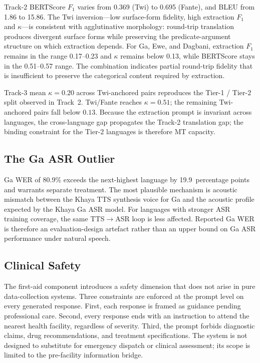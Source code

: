 \documentclass[conference]{IEEEtran}
\begin{document}
Track-2 BERTScore $F_{1}$ varies from 0.369 (Twi) to 0.695 (Fante),
and BLEU from 1.86 to 15.86. The Twi inversion---low surface-form
fidelity, high extraction $F_{1}$ and $\kappa$---is consistent with
agglutinative morphology: round-trip translation produces divergent
surface forms while preserving the predicate-argument structure on
which extraction depends. For Ga, Ewe, and Dagbani, extraction
$F_{1}$ remains in the range 0.17--0.23 and $\kappa$ remains below
0.13, while BERTScore stays in the 0.51--0.57 range. The combination
indicates partial round-trip fidelity that is insufficient to
preserve the categorical content required by extraction.

Track-3 mean $\kappa = 0.20$ across Twi-anchored pairs reproduces
the Tier-1 / Tier-2 split observed in Track~2. Twi/Fante reaches
$\kappa = 0.51$; the remaining Twi-anchored pairs fall below $0.13$.
Because the extraction prompt is invariant across languages, the
cross-language gap propagates the Track-2 translation gap; the
binding constraint for the Tier-2 languages is therefore MT capacity.

\subsection{The Ga ASR Outlier}
\label{sec:ga_outlier}

Ga WER of 80.9\% exceeds the next-highest language by
19.9~percentage points and warrants separate treatment. The most
plausible mechanism is acoustic mismatch between the Khaya TTS
synthesis voice for Ga and the acoustic profile expected by the
Khaya Ga ASR model. For languages with stronger ASR training
coverage, the same TTS$\rightarrow$ASR loop is less affected.
Reported Ga WER is therefore an evaluation-design artefact rather
than an upper bound on Ga ASR performance under natural speech.

\subsection{Clinical Safety}
\label{sec:safety}

The first-aid component introduces a safety dimension that does not
arise in pure data-collection systems. Three constraints are
enforced at the prompt level on every generated response. First,
each response is framed as guidance pending professional care.
Second, every response ends with an instruction to attend the
nearest health facility, regardless of severity. Third, the prompt
forbids diagnostic claims, drug recommendations, and treatment
specifications. The system is not designed to substitute for
emergency dispatch or clinical assessment; its scope is limited to
the pre-facility information bridge.
\end{document}
